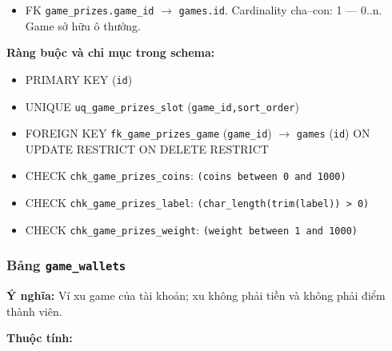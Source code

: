 \begin{itemize}

\item FK \texttt{game\_prizes.game\_id} $\rightarrow$ \texttt{games.id}. Cardinality cha--con: 1 — 0..n. Game sở hữu ô thưởng.

\end{itemize}

\textbf{Ràng buộc và chỉ mục trong schema:}

\begin{itemize}

\item PRIMARY KEY (\texttt{id})

\item UNIQUE \texttt{uq\_game\_prizes\_slot} (\texttt{game\_id,sort\_order})

\item FOREIGN KEY \texttt{fk\_game\_prizes\_game} (\texttt{game\_id}) $\rightarrow$ \texttt{games} (\texttt{id}) ON UPDATE RESTRICT ON DELETE RESTRICT

\item CHECK \texttt{chk\_game\_prizes\_coins}: \texttt{(coins between 0 and 1000)}

\item CHECK \texttt{chk\_game\_prizes\_label}: \texttt{(char\_length(trim(label)) > 0)}

\item CHECK \texttt{chk\_game\_prizes\_weight}: \texttt{(weight between 1 and 1000)}

\end{itemize}

\subsubsection{Bảng \texttt{game\_wallets}}

\textbf{Ý nghĩa:} Ví xu game của tài khoản; xu không phải tiền và không phải điểm thành viên.\par

\textbf{Thuộc tính:}

